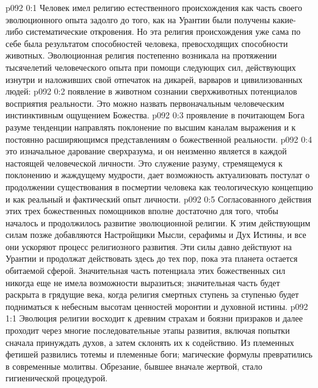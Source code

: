 \author{Мелхиседек}
\vs p092 0:1 Человек имел религию естественного происхождения как часть своего эволюционного опыта задолго до того, как на Урантии были получены какие\hyp{}либо систематические откровения. Но эта религия  происхождения уже сама по себе была результатом способностей человека, превосходящих способности животных. Эволюционная религия постепенно возникала на протяжении тысячелетий человеческого опыта при помощи следующих сил, действующих изнутри и наложивших свой отпечаток на дикарей, варваров и цивилизованных людей:
\vs p092 0:2 \bibnobreakspace {} появление в животном сознании сверхживотных потенциалов восприятия реальности. Это можно назвать первоначальным человеческим инстинктивным ощущением Божества.
\vs p092 0:3 \pc {}\bibnobreakspace {} проявление в почитающем Бога разуме тенденции направлять поклонение по высшим каналам выражения и к постоянно расширяющимся представлениям о божественной реальности.
\vs p092 0:4 \pc {}\bibnobreakspace {} это изначальное дарование сверхразума, и он неизменно является в каждой настоящей человеческой личности. Это служение разуму, стремящемуся к поклонению и жаждущему мудрости, дает возможность актуализовать постулат о продолжении существования в посмертии человека как теологическую концепцию и как реальный и фактический опыт личности.
\vs p092 0:5 \pc Согласованного действия этих трех божественных помощников вполне достаточно для того, чтобы началось и продолжилось развитие эволюционной религии. К этим действующим силам позже добавляются Настройщики Мысли, серафимы и Дух Истины, и все они ускоряют процесс религиозного развития. Эти силы давно действуют на Урантии и продолжат действовать здесь до тех пор, пока эта планета остается обитаемой сферой. Значительная часть потенциала этих божественных сил никогда еще не имела возможности выразиться; значительная часть будет раскрыта в грядущие века, когда религия смертных ступень за ступенью будет подниматься к небесным высотам ценностей моронтии и духовной истины.
\vs p092 1:1 Эволюция религии восходит к древним страхам и боязни призраков и далее проходит через многие последовательные этапы развития, включая попытки сначала принуждать духов, а затем склонять их к содействию. Из племенных фетишей развились тотемы и племенные боги; магические формулы превратились в современные молитвы. Обрезание, бывшее вначале жертвой, стало гигиенической процедурой.
